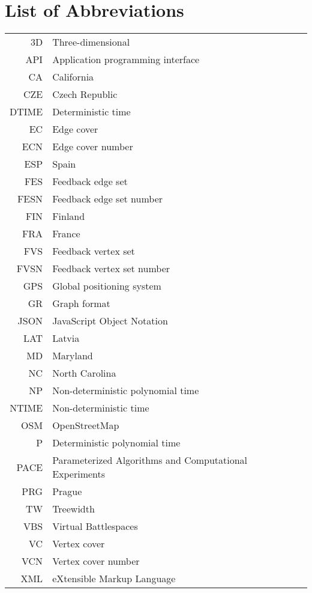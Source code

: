 \documentclass[english,bachelor,unicode,twoside]{ctufit-thesis}
\theoremstyle{plain}
\theoremstyle{definition}
\theoremstyle{remark}
\numberwithin{theorem}{chapter}
\begin{document}
\chapter{List of Abbreviations}
	
\begin{tabular}{rl}
    3D      &   Three-dimensional \tabularnewline
    API     &   Application programming interface \tabularnewline
    CA      &   California \tabularnewline
    CZE     &   Czech Republic \tabularnewline
    DTIME   &   Deterministic time \tabularnewline
    EC      &   Edge cover \tabularnewline
    ECN     &   Edge cover number \tabularnewline
    ESP     &   Spain \tabularnewline
    FES     &   Feedback edge set \tabularnewline
    FESN    &   Feedback edge set number \tabularnewline
    FIN     &   Finland \tabularnewline
    FRA     &   France \tabularnewline
    FVS     &   Feedback vertex set \tabularnewline
    FVSN    &   Feedback vertex set number \tabularnewline
    GPS     &   Global positioning system \tabularnewline
    GR      &   Graph format \tabularnewline
    JSON    &   JavaScript Object Notation \tabularnewline
    LAT     &   Latvia \tabularnewline
    MD      &   Maryland \tabularnewline
    NC      &   North Carolina \tabularnewline
    NP      &   Non-deterministic polynomial time \tabularnewline
    NTIME   &   Non-deterministic time \tabularnewline
    OSM     &   OpenStreetMap \tabularnewline
    P       &   Deterministic polynomial time \tabularnewline
    PACE    &   Parameterized Algorithms and Computational Experiments \tabularnewline
    PRG     &   Prague \tabularnewline
    TW      &   Treewidth \tabularnewline
    VBS     &   Virtual Battlespaces \tabularnewline
    VC      &   Vertex cover \tabularnewline
    VCN     &   Vertex cover number \tabularnewline
    XML     &   eXtensible Markup Language \tabularnewline
\end{tabular}

\mainmatter\mainmatterinit %



\appendix\appendixinit %

\backmatter %

\printbibliography %

\end{document}
